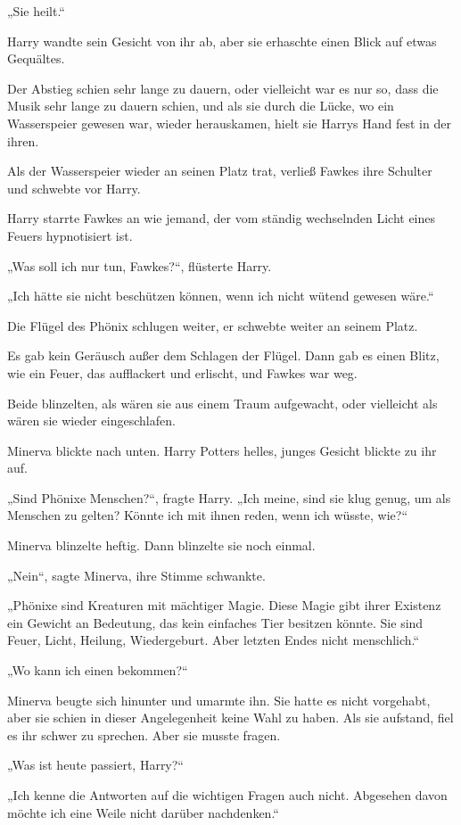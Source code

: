 {„Sie heilt.“

Harry wandte sein Gesicht von ihr ab, aber sie erhaschte einen Blick auf etwas Gequältes.

Der Abstieg schien sehr lange zu dauern, oder vielleicht war es nur so, dass die Musik sehr lange zu dauern schien, und als sie durch die Lücke, wo ein Wasserspeier gewesen war, wieder herauskamen, hielt sie Harrys Hand fest in der ihren.

Als der Wasserspeier wieder an seinen Platz trat, verließ Fawkes ihre Schulter und schwebte vor Harry.

Harry starrte Fawkes an wie jemand, der vom ständig wechselnden Licht eines Feuers hypnotisiert ist.

„Was soll ich nur tun, Fawkes?“, flüsterte Harry.

„Ich hätte sie nicht beschützen können, wenn ich nicht wütend gewesen wäre.“

Die Flügel des Phönix schlugen weiter, er schwebte weiter an seinem Platz.

Es gab kein Geräusch außer dem Schlagen der Flügel. Dann gab es einen Blitz, wie ein Feuer, das aufflackert und erlischt, und Fawkes war weg.

Beide blinzelten, als wären sie aus einem Traum aufgewacht, oder vielleicht als wären sie wieder eingeschlafen.

Minerva blickte nach unten. Harry Potters helles, junges Gesicht blickte zu ihr auf.

„Sind Phönixe Menschen?“, fragte Harry. „Ich meine, sind sie klug genug, um als Menschen zu gelten? Könnte ich mit ihnen reden, wenn ich wüsste, wie?“

Minerva blinzelte heftig. Dann blinzelte sie noch einmal.

„Nein“, sagte Minerva, ihre Stimme schwankte.

„Phönixe sind Kreaturen mit mächtiger Magie. Diese Magie gibt ihrer Existenz ein Gewicht an Bedeutung, das kein einfaches Tier besitzen könnte. Sie sind Feuer, Licht, Heilung, Wiedergeburt. Aber letzten Endes nicht menschlich.“

„Wo kann ich einen bekommen?“

Minerva beugte sich hinunter und umarmte ihn. Sie hatte es nicht vorgehabt, aber sie schien in dieser Angelegenheit keine Wahl zu haben. Als sie aufstand, fiel es ihr schwer zu sprechen. Aber sie musste fragen.

„Was ist heute passiert, Harry?“

„Ich kenne die Antworten auf die wichtigen Fragen auch nicht. Abgesehen davon möchte ich eine Weile nicht darüber nachdenken.“

}

